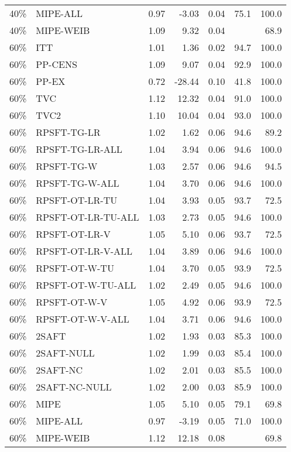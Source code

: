 \begin{table}[ht]
{\begin{tabular}{llrrrrr}
  40\% & MIPE-ALL & 0.97 & -3.03 & 0.04 & 75.1 & 100.0 \\ 
  40\% & MIPE-WEIB & 1.09 & 9.32 & 0.04 &  & 68.9 \\ 
   \hline
60\% & ITT & 1.01 & 1.36 & 0.02 & 94.7 & 100.0 \\ 
  60\% & PP-CENS & 1.09 & 9.07 & 0.04 & 92.9 & 100.0 \\ 
  60\% & PP-EX & 0.72 & -28.44 & 0.10 & 41.8 & 100.0 \\ 
  60\% & TVC & 1.12 & 12.32 & 0.04 & 91.0 & 100.0 \\ 
  60\% & TVC2 & 1.10 & 10.04 & 0.04 & 93.0 & 100.0 \\ 
   \hline
60\% & RPSFT-TG-LR & 1.02 & 1.62 & 0.06 & 94.6 & 89.2 \\ 
  60\% & RPSFT-TG-LR-ALL & 1.04 & 3.94 & 0.06 & 94.6 & 100.0 \\ 
  60\% & RPSFT-TG-W & 1.03 & 2.57 & 0.06 & 94.6 & 94.5 \\ 
  60\% & RPSFT-TG-W-ALL & 1.04 & 3.70 & 0.06 & 94.6 & 100.0 \\ 
  60\% & RPSFT-OT-LR-TU & 1.04 & 3.93 & 0.05 & 93.7 & 72.5 \\ 
  60\% & RPSFT-OT-LR-TU-ALL & 1.03 & 2.73 & 0.05 & 94.6 & 100.0 \\ 
  60\% & RPSFT-OT-LR-V & 1.05 & 5.10 & 0.06 & 93.7 & 72.5 \\ 
  60\% & RPSFT-OT-LR-V-ALL & 1.04 & 3.89 & 0.06 & 94.6 & 100.0 \\ 
   \hline
60\% & RPSFT-OT-W-TU & 1.04 & 3.70 & 0.05 & 93.9 & 72.5 \\ 
  60\% & RPSFT-OT-W-TU-ALL & 1.02 & 2.49 & 0.05 & 94.6 & 100.0 \\ 
  60\% & RPSFT-OT-W-V & 1.05 & 4.92 & 0.06 & 93.9 & 72.5 \\ 
  60\% & RPSFT-OT-W-V-ALL & 1.04 & 3.71 & 0.06 & 94.6 & 100.0 \\ 
   \hline
60\% & 2SAFT & 1.02 & 1.93 & 0.03 & 85.3 & 100.0 \\ 
  60\% & 2SAFT-NULL & 1.02 & 1.99 & 0.03 & 85.4 & 100.0 \\ 
  60\% & 2SAFT-NC & 1.02 & 2.01 & 0.03 & 85.5 & 100.0 \\ 
  60\% & 2SAFT-NC-NULL & 1.02 & 2.00 & 0.03 & 85.9 & 100.0 \\ 
  60\% & MIPE & 1.05 & 5.10 & 0.05 & 79.1 & 69.8 \\ 
  60\% & MIPE-ALL & 0.97 & -3.19 & 0.05 & 71.0 & 100.0 \\ 
  60\% & MIPE-WEIB & 1.12 & 12.18 & 0.08 &  & 69.8 \\ 
   \hline
\end{tabular}
}
\end{table}
